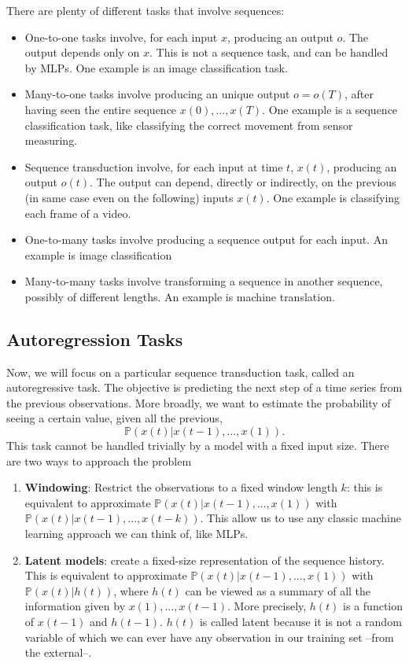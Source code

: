 \documentclass[oneside]{book}
\theoremstyle{definition}
\theoremstyle{plain}
\begin{document}
There are plenty of different tasks that involve sequences:
\begin{itemize}
    \item One-to-one tasks involve, for each input $x$, producing an output $o$. The output depends only on $x$. This is not a sequence task, and can be handled by MLPs. One example is an image classification task.
    \item Many-to-one tasks involve producing an unique output $o=o(T)$, after having seen the entire sequence $x(0),...,x(T)$. One example is a sequence classification task, like classifying the correct movement from sensor measuring.
    \item Sequence transduction involve, for each input at time $t$, $x(t)$, producing an output $o(t)$. The output can depend, directly or indirectly, on the previous (in same case even on the following) inputs $x(t)$. One example is classifying each frame of a video.
    \item One-to-many tasks involve producing a sequence output for each input. An example is image classification
    \item Many-to-many tasks involve transforming a sequence in another sequence, possibly of  different lengths. An example is machine translation.
\end{itemize}
\subsection{Autoregression Tasks}
Now, we will focus on a particular sequence transduction task, called an autoregressive task.  The objective is predicting the next step of a time series from the previous observations. More broadly, we want to estimate the probability of seeing a certain value, given all the previous,
\begin{equation}
    \mathbb{P}(x(t)|x(t-1),...,x(1)).
\end{equation}
This task cannot be handled trivially by a model with a fixed input size. There are two ways to approach the problem
\begin{enumerate}
    \item \textbf{Windowing}: Restrict the observations to a fixed window length $k$: this is equivalent to approximate $\mathbb{P}(x(t)|x(t-1),...,x(1))$ with $\mathbb{P}(x(t)|x(t-1),...,x(t-k))$. This allow us to use any classic machine learning approach we can think of, like MLPs.
    \item \textbf{Latent models}: create a fixed-size representation of the sequence history. This is equivalent to approximate $\mathbb{P}(x(t)|x(t-1),...,x(1))$ with $\mathbb{P}(x(t)|h(t))$, where $h(t)$ can be viewed as a summary of all the information given by $x(1),...,x(t-1)$.  More precisely, $h(t)$ is a function of  $x(t-1)$ and $h(t-1)$. $h(t)$ is called latent because it is not a random variable of which we can ever have any observation in our training set --from the external--.

\end{enumerate}
\end{document}
